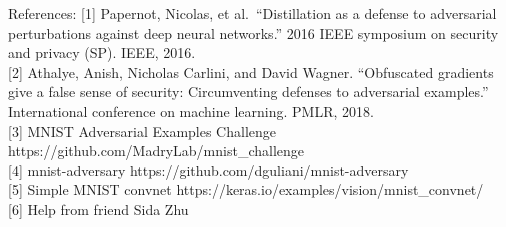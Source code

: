 \documentclass[
]{article}
\begin{document}
References: {[}1{]} Papernot, Nicolas, et al.~``Distillation as a
defense to adversarial perturbations against deep neural networks.''
2016 IEEE symposium on security and privacy (SP). IEEE, 2016.\\
{[}2{]} Athalye, Anish, Nicholas Carlini, and David Wagner. ``Obfuscated
gradients give a false sense of security: Circumventing defenses to
adversarial examples.'' International conference on machine learning.
PMLR, 2018.\\
{[}3{]} MNIST Adversarial Examples Challenge
https://github.com/MadryLab/mnist\_challenge\\
{[}4{]} mnist-adversary https://github.com/dguliani/mnist-adversary\\
{[}5{]} Simple MNIST convnet
https://keras.io/examples/vision/mnist\_convnet/\\
{[}6{]} Help from friend Sida Zhu
\end{document}
